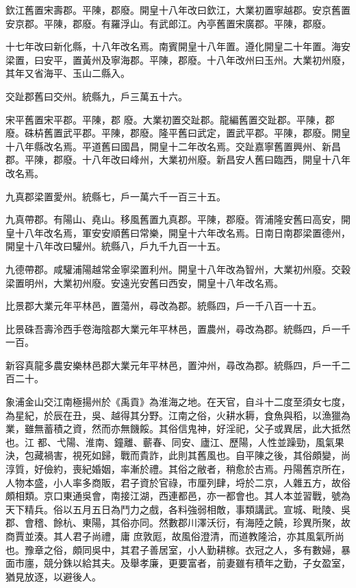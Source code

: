 \begin{pinyinscope}
 欽江舊置宋壽郡。平陳，郡廢。開皇十八年改曰欽江，大業初置寧越郡。安京舊置安京郡。平陳，郡廢。有羅浮山。有武郎江。內亭舊置宋廣郡。平陳，郡廢。



 十七年改曰新化縣，十八年改名焉。南賓開皇十八年置。遵化開皇二十年置。海安梁置，曰安平，置黃州及寧海郡。平陳，郡廢。十八年改州曰玉州。大業初州廢，其年又省海平、玉山二縣入。



 交趾郡舊曰交州。統縣九，戶三萬五十六。



 宋平舊置宋平郡。平陳，郡
 廢。大業初置交趾郡。龍編舊置交趾郡。平陳，郡廢。硃枿舊置武平郡。平陳，郡廢。隆平舊曰武定，置武平郡。平陳，郡廢。開皇十八年縣改名焉。平道舊曰國昌，開皇十二年改名焉。交趾嘉寧舊置興州、新昌郡。平陳，郡廢。十八年改曰峰州，大業初州廢。新昌安人舊曰臨西，開皇十八年改名焉。



 九真郡梁置愛州。統縣七，戶一萬六千一百三十五。



 九真帶郡。有陽山、堯山。移風舊置九真郡。平陳，郡廢。胥浦隆安舊曰高安，開皇十八年改名焉，軍安安順舊曰常樂，開皇十六年改名焉。日南日南郡梁置德州，開皇十八年改曰驩州。統縣八，戶九千九百一十五。



 九德帶郡。咸驩浦陽越常金寧梁置利州。開皇十八年改為智州，大業初州廢。交穀梁置明州，大業初州廢。安遠光安舊曰西安，開皇十八年改名焉。



 比景郡大業元年平林邑，置蕩州，尋改為郡。統縣四，戶一千八百一十五。



 比景硃吾壽泠西手卷海陰郡大業元年平林邑，置農州，尋改為郡。統縣四，戶一千一百。



 新容真龍多農安樂林邑郡大業元年平林邑，置沖州，尋改為郡。統縣四，戶一千二百二十。



 象浦金山交江南極揚州於《禹貢》為淮海之地。在天官，自斗十二度至須女七度，為星紀，於辰在丑，吳、越得其分野。江南之俗，火耕水耨，食魚與稻，以漁獵為業，雖無蓄積之資，然而亦無饑餒。其俗信鬼神，好淫祀，父子或異居，此大抵然也。江
 都、弋陽、淮南、鐘離、蘄春、同安、廬江、歷陽，人性並躁勁，風氣果決，包藏禍害，視死如歸，戰而貴詐，此則其舊風也。自平陳之後，其俗頗變，尚淳質，好儉約，喪紀婚姻，率漸於禮。其俗之敝者，稍愈於古焉。丹陽舊京所在，人物本盛，小人率多商販，君子資於官祿，市厘列肆，埒於二京，人雜五方，故俗頗相類。京口東通吳會，南接江湖，西連都邑，亦一都會也。其人本並習戰，號為天下精兵。俗以五月五日為鬥力之戲，各料強弱相敵，事類講武。宣城、毗陵、吳郡、會稽、餘杭、東陽，其俗亦同。然數郡川澤沃衍，有海陸之饒，珍異所聚，故商賈並湊。其人君子尚禮，庸
 庶敦厖，故風俗澄清，而道教隆洽，亦其風氣所尚也。豫章之俗，頗同吳中，其君子善居室，小人勤耕稼。衣冠之人，多有數婦，暴面市廛，競分銖以給其夫。及舉孝廉，更要富者，前妻雖有積年之勤，子女盈室，猶見放逐，以避後人。




\end{pinyinscope}
